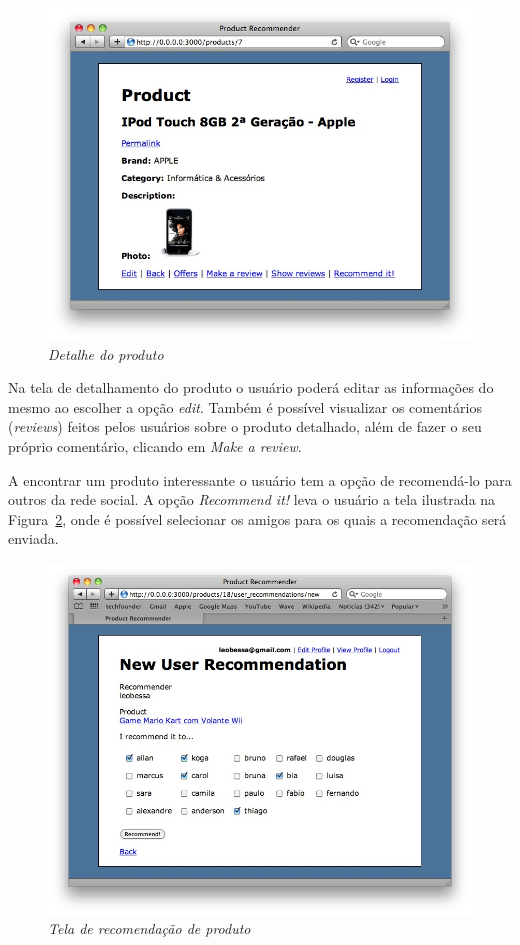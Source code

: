 \begin{figure}
  \centering
  \includegraphics[width=\textwidth]{imagens/Detalhe_Produto_Prototipo}
  \caption{\it Detalhe do produto}
  \label{fig:detalhe_produto_prototipo}
\end{figure}

 Na tela de detalhamento do produto o usuário poderá editar as informações do mesmo ao escolher a opção \textit{edit}. Também é possível visualizar os comentários (\textit{reviews}) feitos pelos usuários sobre o produto detalhado, além de fazer o seu próprio comentário, clicando em \textit{Make a review}.
  
 A encontrar um produto interessante o usuário tem a opção de recomendá-lo para outros da rede social. A opção \emph{Recommend it!} leva o usuário a tela ilustrada na Figura~\ref{fig:recomendacao_produto_prototipo}, onde é possível selecionar os amigos para os quais a recomendação será enviada.         
 
 \begin{figure}
   \centering
   \includegraphics[width=\textwidth]{imagens/TELA_RECOMENDACAO_PROTOTIPO}
   \caption{\it Tela de recomendação de produto}
   \label{fig:recomendacao_produto_prototipo}
 \end{figure}
